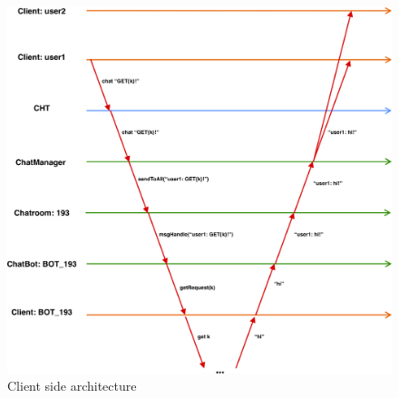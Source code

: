 \begin{figure}[h]
	\centering
	\includegraphics[width=\linewidth]{figures/chat_graph.png}
	\caption{Client side architecture}
\end{figure}



